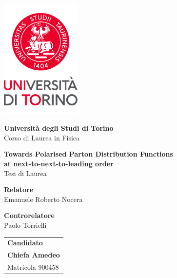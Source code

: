 \begin{titlepage}
  \centering
  \vspace*{0.5cm}

  \includegraphics[width=0.3\textwidth]{./images/newlogo.pdf}

  \vspace{1.5cm}

  \LARGE
  \textbf{Università degli Studi di Torino}\\

  \vspace{1mm}
  Corso di Laurea in Fisica
        
  \vspace{2cm}

  \textbf{Towards Polarised Parton Distribution Functions}\\
  \textbf{at next-to-next-to-leading order}\\
  Tesi di Laurea\\

  \vfill

  \raggedright

  \large

  \textbf{Relatore}\\
  Emanuele Roberto Nocera\\

  \vspace{10mm}

  \textbf{Controrelatore}\\
  Paolo Torrielli\\

  \vspace{5mm}

  \begin{flushright}
    \begin{tabular}{@{}l@{}}
      \textbf{Candidato}\\
      \textbf{Chiefa Amedeo}\\
      Matricola 900458
      \end{tabular}
  \end{flushright}


\end{titlepage}
